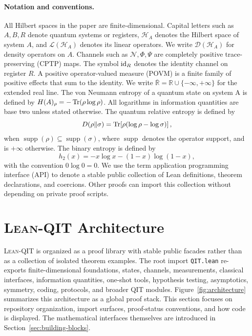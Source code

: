 \documentclass[10pt,a4paper]{article}
\DeclareRobustCommand{\LeanQIT}{\textnormal{\textsc{Lean-QIT}}}
\begin{document}
\paragraph{Notation and conventions.}
All Hilbert spaces in the paper are finite-dimensional.  Capital letters such
as $A,B,R$ denote quantum systems or registers, $\mathcal H_A$ denotes the
Hilbert space of system $A$, and $\mathcal L(\mathcal H_A)$ denotes its linear operators.  We write $\mathcal D(\mathcal H_A)$ for density operators on $A$. Channels such as $\mathcal N,\Phi,\Psi$ are completely positive
trace-preserving (CPTP) maps.  The symbol ${\operatorname{id}}_R$ denotes the identity channel	on register $R$.  A positive operator-valued measure (POVM) is a finite family
of positive effects that sum to the identity.  We write
$\overline{\mathbb R}=\mathbb R\cup\{-\infty,+\infty\}$ for the
extended real line.  The von Neumann entropy of a quantum state on system A is defined by $H(A)_\rho =-\operatorname{Tr}(\rho\log\rho)$.  All logarithms in information quantities are
base two unless stated otherwise.  The quantum relative entropy is defined by
\begin{equation}
    D(\rho\Vert\sigma)=\operatorname{Tr}\!\left[\rho(\log\rho-\log\sigma)\right],
\end{equation}
when $\operatorname{supp}(\rho)\subseteq\operatorname{supp}(\sigma)$, where
$\operatorname{supp}$ denotes the operator support, and is $+\infty$
otherwise.  The binary entropy is defined by
\begin{equation}
    h_2(x)=-x\log x-(1-x)\log(1-x),
\end{equation}
with the convention $0\log 0=0$.  We use the term application programming
interface (API) to denote a stable public collection of Lean definitions,
theorem declarations, and coercions.  Other proofs can import this collection
without depending on private proof scripts.
	
	
\section{\LeanQIT{} Architecture}
\label{sec:architecture}

\LeanQIT{} is organized as a proof library with stable public facades rather
than as a collection of isolated theorem examples.  The root import
\texttt{QIT.lean} re-exports finite-dimensional foundations, states,
channels, measurements, classical interfaces, information quantities,
one-shot tools, hypothesis testing, asymptotics, symmetry, coding, protocols,
and broader QIT modules.  Figure~\ref{fig:architecture} summarizes this
architecture as a global proof stack.  This section focuses
on repository organization, import surfaces, proof-status conventions, and
how code is displayed. The mathematical interfaces themselves are introduced
in Section~\ref{sec:building-blocks}.
\end{document}
